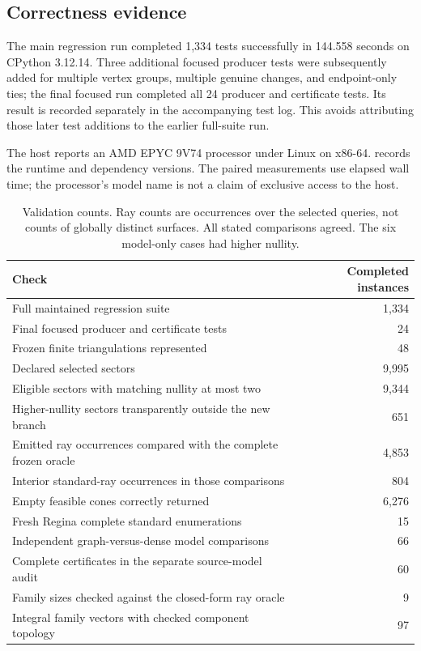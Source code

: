 \subsection{Correctness evidence}

The main regression run completed 1,334 tests successfully in 144.558 seconds
on CPython 3.12.14. Three additional focused producer tests were subsequently
added for multiple vertex groups, multiple genuine changes, and endpoint-only
ties; the final focused run completed all 24 producer and certificate tests.
Its result is recorded separately in the accompanying test log. This avoids attributing those later test additions to the earlier
full-suite run.

The host reports an AMD EPYC 9V74 processor under Linux on x86-64.
 records the runtime and dependency
versions. The paired measurements use elapsed wall time; the processor's
model name is not a claim of exclusive access to the host.

\begin{table}[ht]
\centering
\begin{tabular}{@{}lr@{}}
\toprule
Check & Completed instances\\
\midrule
Full maintained regression suite & 1,334\\
Final focused producer and certificate tests & 24\\
Frozen finite triangulations represented & 48\\
Declared selected sectors & 9,995\\
Eligible sectors with matching nullity at most two & 9,344\\
Higher-nullity sectors transparently outside the new branch & 651\\
Emitted ray occurrences compared with the complete frozen oracle & 4,853\\
Interior standard-ray occurrences in those comparisons & 804\\
Empty feasible cones correctly returned & 6,276\\
Fresh Regina complete standard enumerations & 15\\
Independent graph-versus-dense model comparisons & 66\\
Complete certificates in the separate source-model audit & 60\\
Family sizes checked against the closed-form ray oracle & 9\\
Integral family vectors with checked component topology & 97\\
\bottomrule
\end{tabular}
\caption{Validation counts. Ray counts are occurrences over the selected
queries, not counts of globally distinct surfaces. All stated comparisons
agreed. The six model-only cases had higher nullity.}
\end{table}

